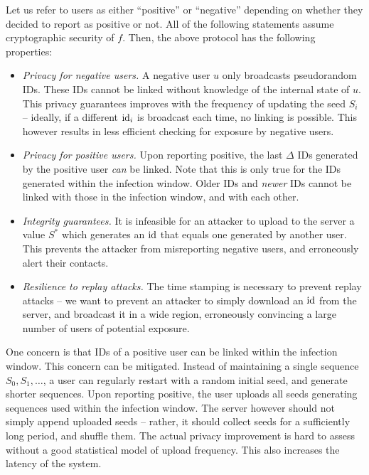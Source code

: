 \documentclass{article}
\begin{document}
 Let us refer to users as either ``positive'' or ``negative'' depending on whether they decided to report as positive or not. All of the following statements assume cryptographic security of $f$. Then, the above protocol has the following properties:
\begin{itemize}
    \item {\em Privacy for negative users.}  A negative user $u$ only broadcasts pseudorandom IDs. These IDs cannot be linked without knowledge of the internal state of $u$. This privacy guarantees improves with the frequency of updating the seed $S_i$ -- ideally, if a different $\mathrm{id}_i$ is broadcast each time, no linking is possible. This however results in less efficient checking for exposure by negative users.
    \item {\em Privacy for positive users.} Upon reporting positive, the last $\Delta$ IDs generated by the positive user {\em can} be linked. Note that this is only true for the IDs generated within the infection window. Older IDs and {\em newer} IDs cannot be linked with those in the infection window, and with each other.
    \item {\em Integrity guarantees.} It is infeasible for an attacker to upload to the server a value $S^*$ which generates an $\mathrm{id}$ that equals one generated by another user. This prevents the attacker from misreporting negative users, and erroneously alert their contacts.  
    \item {\em Resilience to replay attacks.} The time stamping is necessary to prevent replay attacks -- we want to prevent an attacker to simply download an $\mathrm{id}$ from the server, and broadcast it in a wide region, erroneously convincing a large number of users of potential exposure.
\end{itemize}

 One concern is that IDs of a positive user can be linked within the infection window. This concern can be mitigated. Instead of maintaining a single sequence $S_0, S_1, \ldots$, a user can regularly restart with a random initial seed, and generate  shorter sequences. Upon reporting positive, the user uploads all seeds generating sequences used within the infection window. The server however should not simply append uploaded seeds -- rather, it should collect seeds for a sufficiently long period, and shuffle them. The actual privacy improvement is  hard to assess without a good statistical model of upload frequency. This also increases the latency of the system.
\end{document}
